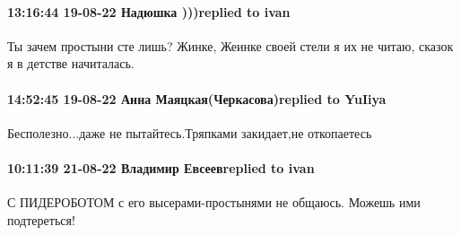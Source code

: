  
 
 
 
 

\paragraph{13:16:44 19-08-22 Надюшка )))replied to ivan}

Ты зачем простыни сте лишь? Жинке, Жеинке своей стели я их не читаю, сказок я в
детстве начиталась.

\paragraph{14:52:45 19-08-22 Анна Маяцкая(Черкасова)replied to YuIiya}

Бесполезно...даже не пытайтесь.Тряпками закидает,не откопаетесь 🤣🤣

\paragraph{10:11:39 21-08-22 Владимир Евсеевreplied to ivan}

С ПИДЕРОБОТОМ с его высерами-простынями не общаюсь. Можешь ими подтереться!
🤣🤣🤣🤣🤣🤣🤣🤣🤣🤣 👎🏾👎🏾👎🏾👎🏾👎🏾👎🏾👎🏾👎🏾👎🏾👎🏾
